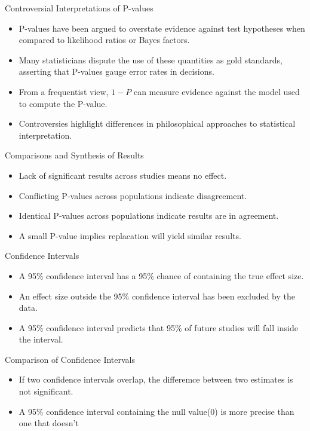 \documentclass[aspectratio=169, 12pt]{beamer}
\begin{document}
\begin{frame}{Controversial Interpretations of P-values}
\begin{itemize}
    \item P-values have been argued to overstate evidence against test hypotheses when compared to likelihood ratios or Bayes factors.
    \item Many statisticians dispute the use of these quantities as gold standards, asserting that P-values gauge error rates in decisions.
    \item From a frequentist view, \( 1 - P \) can measure evidence against the model used to compute the P-value.
    \item Controversies highlight differences in philosophical approaches to statistical interpretation.
\end{itemize}
\end{frame}

\begin{frame}{Comparisons and Synthesis of Results} %
\begin{itemize}
    \item Lack of significant results across studies means no effect.
    \item Conflicting P-values across populations indicate disagreement.
    \item Identical P-values across populations indicate results are in agreement.
    \item A small P-value implies replacation will yield similar results.
\end{itemize}
\end{frame}


\begin{frame}{Confidence Intervals} %
\begin{itemize}
    \item A 95\% confidence interval has a 95\% chance of containing the true effect size.
    \item An effect size outside the 95\% confidence interval has been excluded by the data.
    \item A 95\% confidence interval predicts that 95\% of future studies will fall inside the interval.
\end{itemize}
\end{frame}

\begin{frame}{Comparison of Confidence Intervals} %
\begin{itemize}
    \item If two confidence intervals overlap, the differemce between two estimates is not significant.
    \item A 95\% confidence interval containing the null value(0) is more precise than one that doesn't
\end{itemize}
\end{frame}
\end{document}
